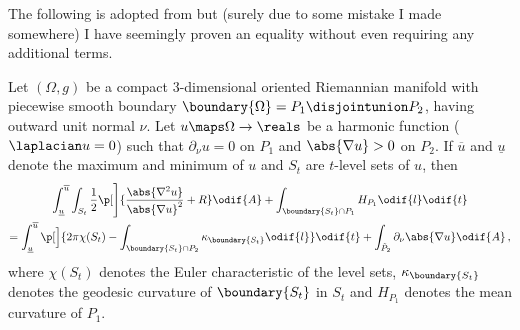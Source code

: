 \documentclass[titlepage,numbers=noenddot,oneside,%
cleardoublepage=empty,paper=a4,fontsize=11pt,%
english,%
]{scrartcl}
\newcommand*{\mathcomma}{\,,}
\newcommand*{\mathfullstop}{\,.}
\newcommand{\Ricci}{\mathrm{Ric}} %
\begin{document}
The following is adopted from \cite[Proposition 4.2]{brayHarmonicFunctionsMass2019} but (surely due to some mistake I made somewhere) I have seemingly proven an equality without even requiring any additional terms.
    {\newcommand{\maxu}{\overline{u}}
        \newcommand{\minu}{\underline{u}}
        \newcommand{\nonzeroboundary}{\partial_{\neq 0}\Omega}
        \begin{proposition}\label{prop:main_inequality}
            Let \( (\Omega,g) \) be a compact 3-dimensional oriented Riemannian manifold with piecewise smooth boundary \( \boundary{\Omega}=P_1\disjointunion P_2 \), having outward unit normal \( \nu \). Let \( u\maps \Omega\to \reals \) be a harmonic function (\ie \( \laplacian u=0 \)) such that \( \partial_{\nu}u=0 \) on \( P_1 \) and \( \abs{\nabla u}> 0 \) on \( P_2 \). If \( \maxu \) and \( \minu \) denote the maximum and minimum of \( u \) and \( S_t \) are \( t \)-level sets of \( u \), then
            \begin{multline*}
                \int_{\minu}^{\maxu} \int_{S_t} \frac{1}{2}\p[\Bigg]{\frac{\abs{\nabla^2 u}}{\abs{\nabla u}^2}+R }\odif{A}+\int_{\boundary{S_t}\cap P_1}H_{P_1}\odif{l}\odif{t}\\
                =\int_{\minu}^{\maxu}\p[\Big]{2\pi \chi(S_t)-\int _{\boundary{S_t} \cap P_2}\kappa_{\boundary{S_t}}\odif{l}}\odif{t}+ \int_{\tilde{P}_2}\partial_{\nu} \abs{\nabla u}\odif{A}\mathcomma
            \end{multline*}
            where \( \chi(S_t) \) denotes the Euler characteristic of the level sets, \( \kappa_{\boundary{S_t}} \) denotes the geodesic curvature of \( \boundary{S_t} \) in \( S_t \) and \( H_{P_1} \) denotes the mean curvature of \( P_1 \).
        \end{proposition}
        \newcommand{\secondfundamentalform}{\Romannum{2}}
}
\end{document}
